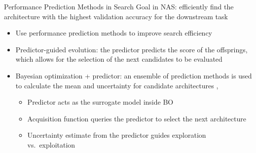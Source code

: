 \documentclass[main]{subfiles}
\begin{document}

\begin{frame}{Performance Prediction Methods in Search}
Goal in NAS: efficiently find the architecture with the highest validation accuracy for the downstream task
\begin{itemize}
    \item Use performance prediction methods to improve search efficiency
    \pause
    \item \alert{Predictor-guided evolution}: the predictor predicts the score of the offsprings, which allows for the selection of the next candidates to be evaluated
    \pause
    \pause
    \item \alert{Bayesian optimization + predictor}: an ensemble of prediction methods is used to calculate the mean and uncertainty for candidate architectures ,
    \pause
    \begin{itemize}
    \item Predictor acts as the \alert{surrogate model} inside BO
    \item Acquisition function queries the predictor to select the next architecture
    \item Uncertainty estimate from the predictor guides exploration vs.\ exploitation
\end{itemize}
\end{itemize}
\end{frame}
\end{document}
